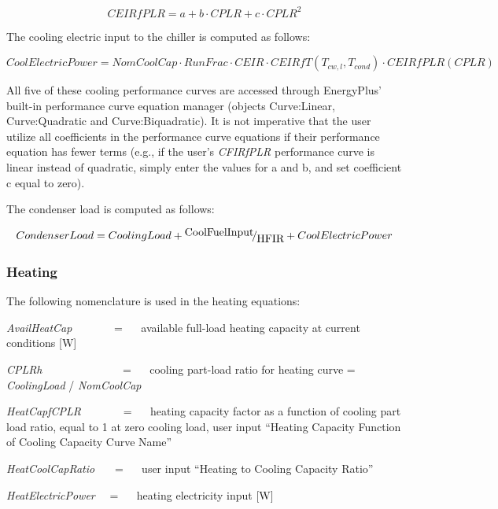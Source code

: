 \begin{equation}
CEIRfPLR = a + b \cdot CPLR + c \cdot CPL{R^2}
\end{equation}

The cooling electric input to the chiller is computed as follows:

\begin{equation}
CoolElectricPower = NomCoolCap \cdot RunFrac \cdot CEIR \cdot CEIRfT({T_{cw,l}},{T_{cond}}) \cdot CEIRfPLR(CPLR)
\end{equation}

All five of these cooling performance curves are accessed through EnergyPlus' built-in performance curve equation manager (objects Curve:Linear, Curve:Quadratic and Curve:Biquadratic). It is not imperative that the user utilize all coefficients in the performance curve equations if their performance equation has fewer terms (e.g., if the user's \emph{CFIRfPLR} performance curve is linear instead of quadratic, simply enter the values for a and b, and set coefficient c equal to zero).

The condenser load is computed as follows:

\begin{equation}
CondenserLoad = CoolingLoad + {\raise0.7ex\hbox{{CoolFuelInput}} \!\mathord{\left/ {\vphantom {{CoolFuelInput} {HFIR}}}\right.}\!\lower0.7ex\hbox{{HFIR}}} + CoolElectricPower
\end{equation}

\subsubsection{Heating}\label{heating}

The following nomenclature is used in the heating equations:

\emph{AvailHeatCap}~~~~~~~ = ~~ available full-load heating capacity at current conditions {[}W{]}

\emph{CPLRh}~~~~~~~~~~~~~~ = ~~ cooling part-load ratio for heating curve = \emph{CoolingLoad} / \emph{NomCoolCap}

\emph{HeatCapfCPLR}~~~~~~~ = ~~ heating capacity factor as a function of cooling part load ratio, equal to 1 at zero cooling load, user input ``Heating Capacity Function of Cooling Capacity Curve Name''

\emph{HeatCoolCapRatio}~~~ = ~~ user input ``Heating to Cooling Capacity Ratio''

\emph{HeatElectricPower}~~ = ~~ heating electricity input {[}W{]}


